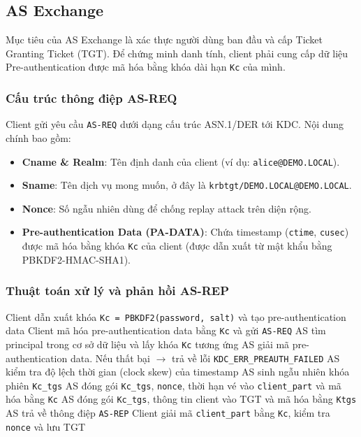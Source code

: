 \documentclass[12pt]{article}
\begin{document}
\subsection{AS Exchange}

Mục tiêu của AS Exchange là xác thực người dùng ban đầu và cấp Ticket Granting Ticket (TGT). Để chứng minh danh tính, client phải cung cấp dữ liệu Pre-authentication được mã hóa bằng khóa dài hạn \texttt{Kc} của mình.

\subsubsection{Cấu trúc thông điệp AS-REQ}
Client gửi yêu cầu \texttt{AS-REQ} dưới dạng cấu trúc ASN.1/DER tới KDC. Nội dung chính bao gồm:
\begin{itemize}
    \item \textbf{Cname \& Realm}: Tên định danh của client (ví dụ: \texttt{alice@DEMO.LOCAL}).
    \item \textbf{Sname}: Tên dịch vụ mong muốn, ở đây là \texttt{krbtgt/DEMO.LOCAL@DEMO.LOCAL}.
    \item \textbf{Nonce}: Số ngẫu nhiên dùng để chống replay attack trên diện rộng.
    \item \textbf{Pre-authentication Data (PA-DATA)}: Chứa timestamp (\texttt{ctime}, \texttt{cusec}) được mã hóa bằng khóa \texttt{Kc} của client (được dẫn xuất từ mật khẩu bằng PBKDF2-HMAC-SHA1).
\end{itemize}

\subsubsection{Thuật toán xử lý và phản hồi AS-REP}
\begin{algorithm}[H]
\caption{Xử lý AS Exchange}
\begin{algorithmic}[1]
\State Client dẫn xuất khóa \texttt{Kc = PBKDF2(password, salt)} và tạo pre-authentication data
\State Client mã hóa pre-authentication data bằng \texttt{Kc} và gửi \texttt{AS-REQ}
\State AS tìm principal trong cơ sở dữ liệu và lấy khóa \texttt{Kc} tương ứng
\State AS giải mã pre-authentication data. Nếu thất bại $\rightarrow$ trả về lỗi \texttt{KDC\_ERR\_PREAUTH\_FAILED}
\State AS kiểm tra độ lệch thời gian (clock skew) của timestamp
\State AS sinh ngẫu nhiên khóa phiên \texttt{Kc\_tgs}
\State AS đóng gói \texttt{Kc\_tgs}, \texttt{nonce}, thời hạn vé vào \texttt{client\_part} và mã hóa bằng \texttt{Kc}
\State AS đóng gói \texttt{Kc\_tgs}, thông tin client vào TGT và mã hóa bằng \texttt{Ktgs}
\State AS trả về thông điệp \texttt{AS-REP}
\State Client giải mã \texttt{client\_part} bằng \texttt{Kc}, kiểm tra \texttt{nonce} và lưu TGT
\end{algorithmic}
\end{algorithm}
\end{document}
